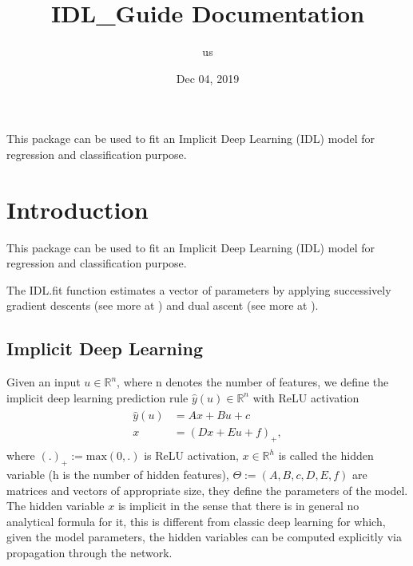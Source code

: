 \documentclass[letterpaper,10pt,english]{sphinxmanual}
\title{IDL\_Guide Documentation}
\date{Dec 04, 2019}
\author{us}
\begin{document}
\pagestyle{empty}
\sphinxmaketitle
\pagestyle{plain}
\sphinxtableofcontents
\pagestyle{normal}
\label{\detokenize{index::doc}}


This package can be used to fit an Implicit Deep Learning (IDL)
model for regression and classification purpose.


\chapter{Introduction}
\label{\detokenize{sections/introduction:introduction}}\label{\detokenize{sections/introduction::doc}}
This package can be used to fit an Implicit Deep Learning (IDL) model for regression
and classification purpose.

The IDL.fit function estimates a vector of parameters by applying successively
gradient descents (see more at {\hyperref[\detokenize{sections/gradient_descents:gradient-descents}]{}}) and dual ascent
(see more at {\hyperref[\detokenize{sections/dual_ascents:dual-ascents}]{}}).


\section{Implicit Deep Learning}
\label{\detokenize{sections/introduction:id1}}
Given an input \(u \in \mathbb{R}^n\), where n denotes the number of features,
we define the implicit deep learning prediction rule \(\hat{y}(u) \in \mathbb{R}^n\) with ReLU activation
\begin{equation}\label{equation:sections/introduction:eq_1}
\begin{split}\begin{align}
    \hat{y}(u) &= Ax + Bu + c \\
    x &= (Dx + Eu + f)_+,
\end{align}\end{split}
\end{equation}
where \((.)_+ := \text{max}(0,.)\) is ReLU activation, \(x \in \mathbb{R}^h\) is called the hidden variable
(h is the number of hidden features), \(\Theta := (A,B,c,D,E,f)\) are matrices and vectors of appropriate size, they define the
parameters of the model. The hidden variable \(x\) is implicit in the sense that there is in general no analytical
formula for it, this is different from classic deep learning for which, given the model parameters, the hidden
variables can be computed explicitly via propagation through the network.
\end{document}

